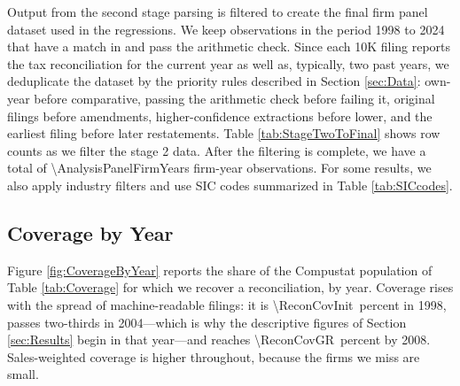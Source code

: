 \documentclass[11pt,letterpaper]{article}
\newcommand{\CountNum}[1]{\num[round-mode=places,round-precision=0]{#1}}
\newcommand{\ShareNum}[1]{\num[round-mode=places,round-precision=1]{#1}}
\begin{document}
Output from the second stage parsing is filtered to create the 
final firm panel dataset used in the regressions.  We keep 
observations in the period 1998 to 2024 that have a match
in \citet{CompustatAnnual} and pass the arithmetic check.
Since each 10K filing reports the tax reconciliation for the 
current year as well as, typically, two past years, we deduplicate the dataset
by the priority rules described in Section \ref{sec:Data}: own-year
before comparative, passing the arithmetic check before failing it,
original filings before amendments, higher-confidence extractions
before lower, and the earliest filing before later restatements. Table \ref{tab:StageTwoToFinal} shows row counts as
we filter the stage 2 data.
After the filtering is complete, we have a total of
\CountNum{\AnalysisPanelFirmYears} firm-year observations.
For some results, we also apply industry filters and use
SIC codes summarized in Table \ref{tab:SICcodes}.

\subsection{Coverage by Year\label{app:coverage}}

Figure \ref{fig:CoverageByYear} reports the share of the Compustat
population of Table \ref{tab:Coverage} for which we recover a
reconciliation, by year. Coverage rises with the spread of machine-readable
filings: it is \ShareNum{\ReconCovInit}\ percent in 1998, passes
two-thirds in 2004---which is why the descriptive figures of Section
\ref{sec:Results} begin in that year---and reaches
\ShareNum{\ReconCovGR}\ percent by 2008. Sales-weighted coverage is
higher throughout, because the firms we miss are small.
\end{document}
